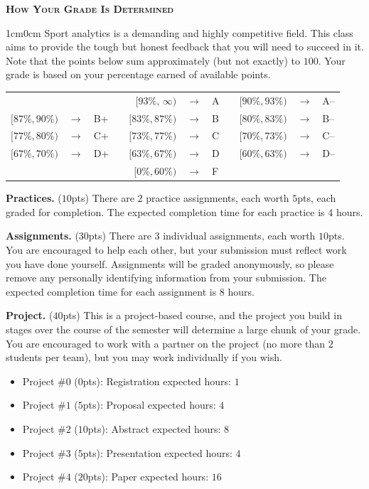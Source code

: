 \documentclass[11pt]{article}
\begin{document}
\newpage
\textbf{\textsc{How Your Grade Is Determined}}
\begin{adjustwidth}{1cm}{0cm}
	Sport analytics is a demanding and highly competitive field. This class aims to provide the tough but honest feedback that you will need to succeed in it. Note that the points below sum approximately (but not exactly) to $100$. Your grade is based on your percentage earned of available points.
  \begin{center}
    \begin{tabular}{rclcrclcrcl}
                      &               &     & & $[93\%,\,\infty)$ & $\rightarrow$ & A & & $[90\%, 93\%)$ & $\rightarrow$	& A--\\
      $[87\%, 90\%)$  & $\rightarrow$	& B+  & & $[83\%, 87\%)$  & $\rightarrow$ & B & & $[80\%, 83\%)$ & $\rightarrow$	& B--\\
      $[77\%, 80\%)$  & $\rightarrow$	& C+  & & $[73\%, 77\%)$  & $\rightarrow$ & C & & $[70\%, 73\%)$ & $\rightarrow$	& C--\\
      $[67\%, 70\%)$  & $\rightarrow$	& D+  & & $[63\%, 67\%)$  & $\rightarrow$ & D & & $[60\%, 63\%)$ & $\rightarrow$  & D--\\
                      &               &     & & $[ 0\%, 60\%)$  & $\rightarrow$ & F\\
    \end{tabular}
  \end{center}
   
  \textbf{Practices.} ($10$pts) There are $2$ practice assignments, each worth $5$pts, each graded for completion. The expected completion time for each practice is $4$ hours.
 
  \textbf{Assignments.} ($30$pts) There are $3$ individual assignments, each worth $10$pts. You are encouraged to help each other, but your submission must reflect work you have done yourself. Assignments will be graded anonymously, so please remove any personally identifying information from your submission. The expected completion time for each assignment is $8$ hours.

  \textbf{Project.} ($40$pts) This is a project-based course, and the project you build in stages over the course of the semester will determine a large chunk of your grade. You are encouraged to work with a partner on the project (no more than $2$ students per team), but you may work individually if you wish.
  \begin{itemize}
    \item Project \#$0$ ($0$pts): Registration                   \hfill expected hours: $1$
    \item Project \#$1$ ($5$pts): Proposal                       \hfill expected hours: $4$
    \item Project \#$2$ ($10$pts): Abstract                      \hfill expected hours: $8$
    \item Project \#$3$ ($5$pts): Presentation                   \hfill expected hours: $4$
    \item Project \#$4$ ($20$pts): Paper                         \hfill expected hours: $16$
  \end{itemize}


\end{adjustwidth}
\end{document}
